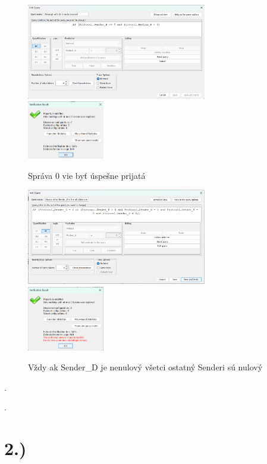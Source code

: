 \documentclass[a4paper]{article}
\begin{document}
\begin{figure}[!h]
	\centering
	\includegraphics[width=0.7\textwidth]{Q1.png}
	\includegraphics[width=0.3\textwidth]{R1.png}
	\caption{Správa 0 vie byť úspešne prijatá}
\end{figure}

\begin{figure}[!h]
	\centering
	\includegraphics[width=0.7\textwidth]{Q4.png}
	\includegraphics[width=0.3\textwidth]{R4.png}
	\caption{Vždy ak Sender\_D je nenulový všetci ostatný Senderi sú nulový}
\end{figure}
\newpage
.

\newpage
.

\newpage

\section{2.)}
\end{document}
